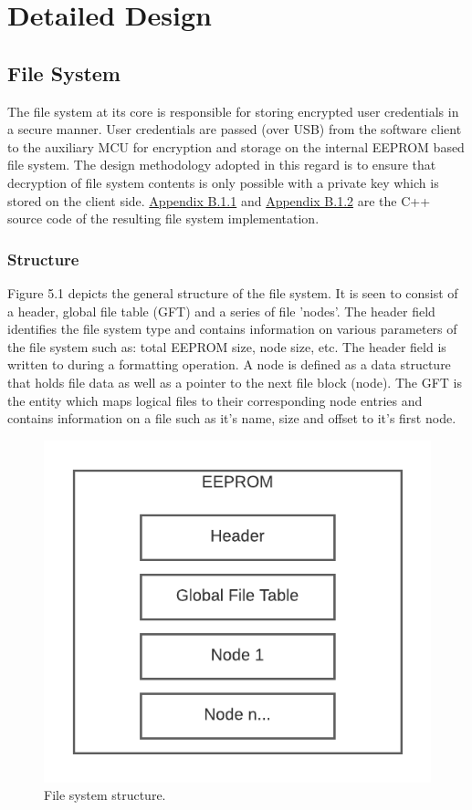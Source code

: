 \section{Detailed Design}
\subsection{File System}

The file system at its core is responsible for storing encrypted user credentials in a secure manner. User credentials are passed (over USB) from the software client to the auxiliary MCU for encryption and storage on the internal EEPROM based file system. The design methodology adopted in this regard is to ensure that decryption of file system contents is only possible with a private key which is stored on the client side. \hyperref[sec:fsh]{Appendix B.1.1} and \hyperref[sec:fscpp]{Appendix B.1.2} are the C++ source code of the resulting file system implementation.
\subsubsection{Structure}

Figure 5.1 depicts the general structure of the file system. It is seen to consist of a header, global file table (GFT) and a series of file 'nodes'. The header field identifies the file system type and contains information on various parameters of the file system such as: total EEPROM size, node size, etc. The header field is written to during a formatting operation. A node is defined as a data structure that holds file data as well as a pointer to the next file block (node). The GFT is the entity which maps logical files to their corresponding node entries and contains information on a file such as it's name, size and offset to it's first node.
\begin{figure}[H]
\centering
\includegraphics[width=0.4\columnwidth]{Figures/Fig_19.png}
\caption{File system structure.}
\label{fig:gantt}
\end{figure}

